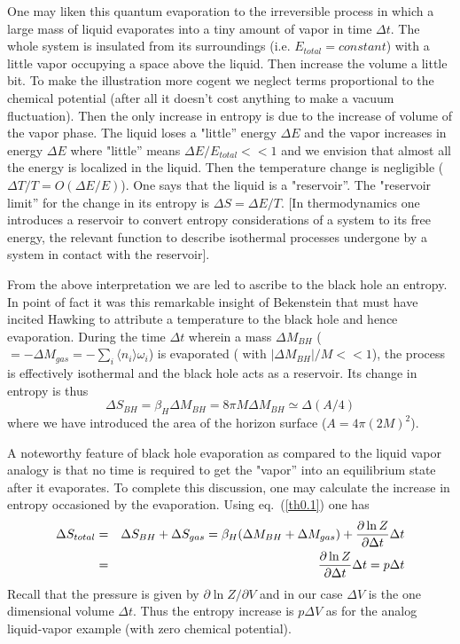 \documentclass[12pt,oneside]{report}
\begin{document}
One may liken this quantum evaporation 
to the irreversible process in which a large
mass of liquid evaporates into a tiny amount of vapor in time $\Delta t$.
The whole system is insulated from its surroundings (i.e.
$E_{total}=constant$) with a little vapor occupying a  space above the
liquid. Then increase the volume a little bit. To make the illustration
more cogent
we neglect terms proportional to the chemical potential (after all
it doesn't cost anything to make a vacuum fluctuation).  Then the only increase
in entropy is due to the increase of volume of the vapor phase. The
liquid loses a "little'' energy $\Delta E$ and the vapor increases in
energy $\Delta E$ where "little'' means $\Delta E / E_{total} <<1$ and we
envision that almost all the energy is localized in the liquid.
Then the temperature change is negligible
($\Delta T / T = O(\Delta E / E)$). One says that the liquid is a
"reservoir''. The "reservoir limit'' for the change in its entropy is
$\Delta S = \Delta E / T$. [In thermodynamics one introduces a reservoir
to convert entropy considerations of a system to its free energy, 
the relevant function to describe isothermal processes undergone by a system
in contact with the reservoir].
\par From the above interpretation we are led to ascribe to the black hole an
entropy. In point of fact it was this remarkable insight of Bekenstein \cite{beken} that must
 have incited Hawking to attribute a temperature to the black hole
and hence evaporation.
During the time $\Delta t$ wherein a mass $\Delta M_{BH}$ 
($= - \Delta M_{gas} =-\sum_i
\langle n_i \rangle \omega_i$) is evaporated ( with $| \Delta M_{BH} |
/ M << 1$),
the process is effectively isothermal and the black hole acts as a
reservoir. Its change in entropy is thus
\begin{equation}
\Delta S_{BH} = \beta_H \Delta M_{BH} = 8 \pi M \Delta M_{BH} \simeq \Delta
(A/4)
\label{th0.4}
\end{equation}
where we have introduced the area of the horizon surface ($A =4 \pi (2
M)^2$). 

A noteworthy feature of black hole evaporation as compared to the liquid
vapor analogy is that no time is required to get the 
"vapor'' into an equilibrium state after it evaporates.
To complete this discussion, one may
calculate the increase in entropy occasioned by the evaporation. Using
eq.~(\ref{th0.1}) one has
\begin{eqnarray}
\Delta S_{total} &=& \Delta S_{BH} + \Delta S_{gas} = \beta_H(\Delta
M_{BH} + \Delta M_{gas}) + {\partial \ln Z \over \partial \Delta
t}\Delta t\nonumber\\
&=& 
{\partial \ln Z \over \partial \Delta
t}\Delta t = p \Delta t
\label{th0.5}
\end{eqnarray}
Recall that the pressure is given
by $\partial \ln Z / \partial V$ and in our case $\Delta V$ is the one
dimensional volume $\Delta t$.
Thus the entropy increase is $p\Delta V$ as for the analog liquid-vapor
example (with zero chemical potential). 
\end{document}

